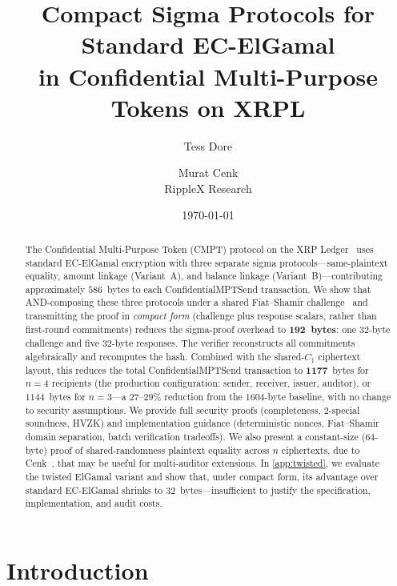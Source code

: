 \documentclass[11pt]{article}
\title{%
  Compact Sigma Protocols for Standard EC-ElGamal\\
  in Confidential Multi-Purpose Tokens on XRPL}
\author{Tess Dore \and Murat Cenk\\[2pt]\normalsize RippleX Research}
\date{\today}
\theoremstyle{definition}
\begin{document}
\maketitle

\begin{abstract}
  The Confidential Multi-Purpose Token (CMPT) protocol on the
  XRP Ledger~\cite{CenkMalhotraAkinyele2026} uses standard EC-ElGamal
  encryption with three separate sigma protocols---same-plaintext
  equality, amount linkage (Variant~A), and balance linkage
  (Variant~B)---contributing approximately $586$~bytes to each
  \textsf{ConfidentialMPTSend} transaction.
  We show that AND-composing these three protocols under a shared
  Fiat--Shamir challenge~\cite{CramerDamgardSchoenmakers1994} and
  transmitting the proof in \emph{compact form} (challenge plus
  response scalars, rather than first-round commitments) reduces the
  sigma-proof overhead to \textbf{192~bytes}: one $32$-byte challenge
  and five $32$-byte responses.
  The verifier reconstructs all commitments algebraically and
  recomputes the hash.
  Combined with the shared-$C_1$ ciphertext layout, this reduces the
  total \textsf{ConfidentialMPTSend} transaction to
  $\mathbf{1177}$~bytes for $n = 4$ recipients (the production
  configuration: sender, receiver, issuer, auditor), or $1144$~bytes
  for $n = 3$---a $27$--$29\%$ reduction from the $1604$-byte baseline,
  with no change to security assumptions.
  We provide full security proofs (completeness, $2$-special soundness,
  HVZK) and implementation guidance (deterministic nonces,
  Fiat--Shamir domain separation, batch verification tradeoffs).
  We also present a constant-size ($64$-byte) proof of
  shared-randomness plaintext equality across $n$ ciphertexts, due to
  Cenk~\cite{Cenk2026unification}, that may be useful for
  multi-auditor extensions.
  In \cref{app:twisted}, we evaluate the twisted ElGamal variant and
  show that, under compact form, its advantage over standard EC-ElGamal
  shrinks to $32$~bytes---insufficient to justify the
  specification, implementation, and audit costs.
\end{abstract}

\tableofcontents
\medskip

\section{Introduction}
\label{sec:intro}
\end{document}
